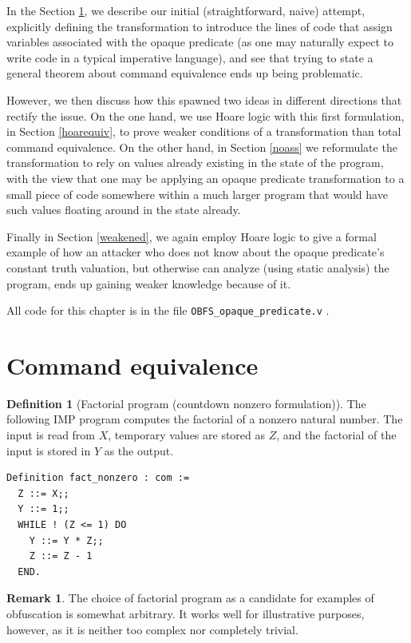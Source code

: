 \documentclass[12pt,notitlepage]{report}
\theoremstyle{plain}
\theoremstyle{definition}
\newtheorem{defin}[theo]{Definition}
\newtheorem{rem}[theo]{Remark}
\numberwithin{equation}{section}
\begin{document}
\par In the Section \ref{naive}, we describe our initial (straightforward, naive) attempt, explicitly defining the transformation to introduce the lines of code that assign variables associated with the opaque predicate (as one may naturally expect to write code in a typical imperative language), and see that trying to state a general theorem about command equivalence ends up being problematic.  
\par However, we then discuss how this spawned two ideas in different directions that rectify the issue.  On the one hand, we use Hoare logic with this first formulation, in Section \ref{hoarequiv}, to prove weaker conditions of a transformation than total command equivalence.  On the other hand, in Section \ref{noass} we reformulate the transformation to rely on values already existing in the state of the program, with the view that one may be applying an opaque predicate transformation to a small piece of code somewhere within a much larger program that would have such values floating around in the state already.
\par Finally in Section \ref{weakened}, we again employ Hoare logic to give a formal example of how an attacker who does not know about the opaque predicate's constant truth valuation, but otherwise can analyze (using static analysis) the program, ends up gaining weaker knowledge because of it.
\par All code for this chapter is in the file \verb$OBFS_opaque_predicate.v$ \cite{repo}.

\section{Command equivalence}\label{naive}
\begin{defin}[Factorial program (countdown nonzero formulation)]\label{Fact}
    The following IMP program computes the factorial of a nonzero natural number.  The input is read from $X$, temporary values are stored as $Z$, and the factorial of the input is stored in $Y$ as the output.
\begin{verbatim}
Definition fact_nonzero : com :=
  Z ::= X;;
  Y ::= 1;;
  WHILE ! (Z <= 1) DO
    Y ::= Y * Z;;
    Z ::= Z - 1
  END.
\end{verbatim}
\end{defin}

\begin{rem}
    The choice of factorial program as a candidate for examples of obfuscation is somewhat arbitrary.  It works well for illustrative purposes, however, as it is neither too complex nor completely trivial.
\end{rem}
\end{document}
